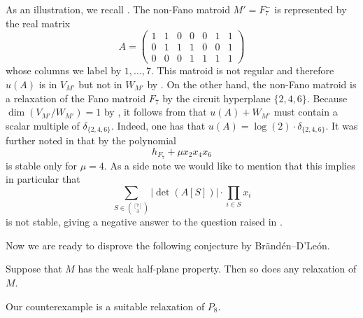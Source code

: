 \begin{ex}\label{ex:f7}
    As an illustration, we recall \cite[Example~4.1]{BrandenDLeon}. The non-Fano matroid $M'=F_7^{-}$ is represented by the real matrix
    \[A=\begin{pmatrix}
        1&1&0&0&0&1&1\\
        0&1&1&1&0&0&1\\
        0&0&0&1&1&1&1
    \end{pmatrix}\]
    whose columns we label by $1,\ldots,7$. This matroid is not regular \cite[\S A.2.2]{HPPlong} and therefore $u(A)$ is in $V_{M'}$ but not in $W_{M'}$ by . On the other hand, the non-Fano matroid is a relaxation of the Fano matroid $F_7$ by the circuit hyperplane $\{2,4,6\}$. Because $\dim(V_{M'}/W_{M'})=1$ by \cite{BrandenDLeon}, it follows from  that $u(A)+W_{M'}$ must contain a scalar multiple of $\delta_{\{2,4,6\}}$. Indeed, one has that $u(A)=\log(2)\cdot\delta_{\{2,4,6\}}$. It was further noted in \cite[Example~4.1]{BrandenDLeon} that by \cite[Example~11.5]{HPPlong} the polynomial
    \begin{equation*}
        h_{F_7}+\mu x_2x_4x_6
    \end{equation*}
    is stable only for $\mu=4$. As a side note we would like to mention that this implies in particular that
    \begin{equation*}
        \sum_{S\in\binom{[7]}{3}}|\det(A[S])|\cdot\prod_{i\in S}x_i
    \end{equation*}
    is not stable, giving a negative answer to the question raised in \cite[Remark~4.2]{purbhoo}.
\end{ex}

Now we are ready to disprove the following conjecture by Br{\"a}nd{\'e}n--{D}'Le{\'o}n.

\begin{con}\label{con:relax}
    Suppose that $M$ has the weak half-plane property. Then so does any relaxation of $M$.
\end{con}

Our counterexample is a suitable relaxation of $P_8$.

